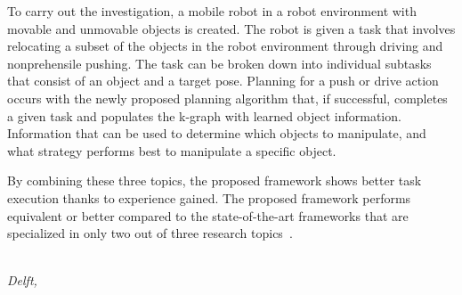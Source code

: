 To carry out the investigation, a mobile robot in a robot environment with movable and unmovable objects is created. The robot is given a task that involves relocating a subset of the objects in the robot environment through driving and nonprehensile pushing. The task can be broken down into individual subtasks that consist of an object and a target pose. Planning for a push or drive action occurs with the newly proposed planning algorithm that, if successful, completes a given task and populates the \acl{k-graph} with learned object information. Information that can be used to determine which objects to manipulate, and what strategy performs best to manipulate a specific object.\bs

By combining these three topics, the proposed framework shows better task execution thanks to experience gained. The proposed framework performs equivalent or better compared to the state-of-the-art frameworks that are specialized in only two out of three research topics~\cite{ellis_navigation_2022,sabbaghnovin_model_2021,scholz_navigation_2016,vega-brown_asymptotically_2020,wang_affordancebased_2020}.\bs

\begin{flushright}
{\makeatletter\itshape
    \@author\\
    Delft, \monthname{} \the\year{}
\makeatother}
\end{flushright}
